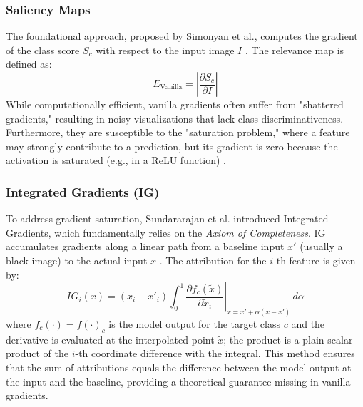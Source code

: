\subsubsection{Saliency Maps}
The foundational approach, proposed by Simonyan et al., computes the gradient of the class score $S_c$ with respect to the input image $I$ \cite{simonyan2014deep}. The relevance map is defined as:
\begin{equation}
    E_{\mathrm{Vanilla}} = \left| \frac{\partial S_c}{\partial I} \right|
\end{equation}
While computationally efficient, vanilla gradients often suffer from "shattered gradients," resulting in noisy visualizations that lack class-discriminativeness. Furthermore, they are susceptible to the "saturation problem," where a feature may strongly contribute to a prediction, but its gradient is zero because the activation is saturated (e.g., in a ReLU function) \cite{sundararajan2017axiomatic}.

\subsubsection{Integrated Gradients (IG)}
To address gradient saturation, Sundararajan et al. introduced Integrated Gradients, which fundamentally relies on the \textit{Axiom of Completeness}. IG accumulates gradients along a linear path from a baseline input $x'$ (usually a black image) to the actual input $x$ \cite{sundararajan2017axiomatic}. The attribution for the $i$-th feature is given by:
\begin{equation}
    IG_i(x) = (x_i - x'_i)\int_{0}^{1}
    \left.\frac{\partial f_c(\tilde{x})}{\partial \tilde{x}_i}
    \right|_{\tilde{x} = x' + \alpha(x - x')}\,d\alpha
\end{equation}
where $f_c(\cdot) = f(\cdot)_c$ is the model output for the target class $c$ and the derivative is evaluated at the interpolated point $\tilde{x}$; the product is a plain scalar product of the $i$-th coordinate difference with the integral. This method ensures that the sum of attributions equals the difference between the model output at the input and the baseline, providing a theoretical guarantee missing in vanilla gradients.

